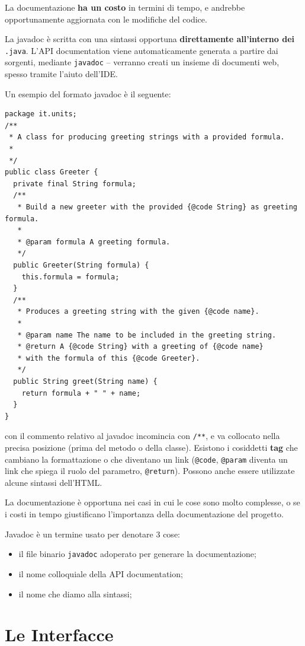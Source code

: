 \documentclass[\fontsizeclass,twocolumn]{\classname}
\let\oldtextsc\textsc
\renewcommand{\textsc}[1]{\oldtextsc{\scfontfs #1}}
\theoremstyle{definition}
\theoremstyle{definition}
\begin{document}
La documentazione \textbf{ha un costo} in termini di tempo, e andrebbe
opportunamente aggiornata con le modifiche del codice.

La javadoc è scritta con una sintassi opportuna \textbf{direttamente
all'interno dei } \texttt{.java}. L'API documentation viene automaticamente
generata a partire dai sorgenti, mediante \texttt{javadoc} -- verranno creati
un insieme di documenti web, spesso tramite l'aiuto dell'\textsc{IDE}.

Un esempio del formato javadoc è il seguente:

\begin{lstlisting}
package it.units;
/**
 * A class for producing greeting strings with a provided formula.
 *
 */
public class Greeter {
  private final String formula;
  /**
   * Build a new greeter with the provided {@code String} as greeting formula.
   *
   * @param formula A greeting formula.
   */
  public Greeter(String formula) {
    this.formula = formula;
  }
  /**
   * Produces a greeting string with the given {@code name}.
   *
   * @param name The name to be included in the greeting string.
   * @return A {@code String} with a greeting of {@code name}
   * with the formula of this {@code Greeter}.
   */
  public String greet(String name) {
    return formula + " " + name;
  }
}
\end{lstlisting}

con il commento relativo al javadoc incomincia con \texttt{/**}, e va collocato
nella precisa posizione (prima del metodo o della classe). Esistono i
cosiddetti \textbf{tag} che cambiano la formattazione o che diventano un link
(\texttt{@code}, \texttt{@param} diventa un link che spiega il ruolo del
parametro, \texttt{@return}). Possono anche essere utilizzate alcune sintassi
dell'HTML.

La documentazione è opportuna nei casi in cui le cose sono molto complesse, o
se i costi in tempo giustificano l'importanza della documentazione del
progetto.

Javadoc è un termine usato per denotare 3 cose:
\begin{itemize}
    \item il file binario \texttt{javadoc} adoperato per generare la
        documentazione;
    \item il nome colloquiale della API documentation;
    \item il nome che diamo alla sintassi;
\end{itemize}

\chapter{Le Interfacce}
\end{document}
